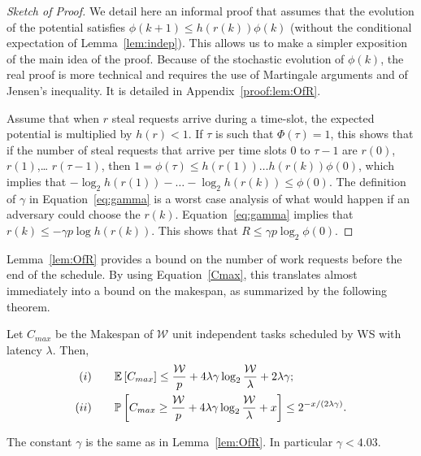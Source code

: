 \begin{proof}[Sketch of Proof]
  We detail here an informal proof that assumes that the evolution of
  the potential satisfies $\phi(k+1)\le h(r(k))\phi(k)$ (without the
  conditional expectation of Lemma~\ref{lem:indep}). This allows us to
  make a simpler exposition of the main idea of the proof.  Because of
  the stochastic evolution of $\phi(k)$, the real proof is more
  technical and requires the use of Martingale arguments and of
  Jensen's inequality. It is detailed in Appendix~\ref{proof:lem:OfR}.
  
  Assume that when $r$ steal requests arrive during a time-slot, the
  expected potential is multiplied by $h(r)<1$. If $\tau$ is such that
  $\Phi(\tau)=1$, this shows that if the number of steal requests that
  arrive per time slots $0$ to $\tau-1$ are $r(0)$, $r(1)$,\dots
  $r(\tau-1)$, then $1=\phi(\tau) \le h(r(1))\dots h(r(k)) \phi(0)$,
  which implies that
  $-\log_2 h(r(1))- \dots - \log_2 h(r(k))\le \phi(0)$.  The
  definition of $\gamma$ in Equation~\eqref{eq:gamma} is a worst case
  analysis of what would happen if an adversary could choose the
  $r(k)$. Equation~\eqref{eq:gamma} implies that
  $r(k)\le -\gamma p\log h(r(k))$. This shows that
  $R\le \gamma p \log_2\phi(0)$.
\end{proof}

Lemma~\ref{lem:OfR} provides a bound on the number of work requests
before the end of the schedule. By using Equation~\eqref{Cmax}, this
translates almost immediately into a bound on the makespan, as
summarized by the following theorem.
\begin{theorem}
  \label{theo:cmax}
  Let $C_{max}$ be the Makespan of $\mathcal{W}$ unit independent
  tasks scheduled by WS with latency $\lambda$.  Then,
  \begin{align*}
    (i)  \qquad &\esp{C_{max}} \leq \frac{\mathcal{W}}{p} +  4\lambda\gamma\log_2\frac{\mathcal{W}}{\lambda}  + 2\lambda\gamma;\\
    (ii) \qquad  &\Proba{ C_{max}  \ge \frac{\mathcal{W}}{p} +
                   4\lambda\gamma\log_2\frac{\mathcal{W}}{\lambda}  +
                   x} \le {2}^{-x/(2\lambda\gamma)}. 
  \end{align*}

  The constant $\gamma$ is the same as in Lemma~\ref{lem:OfR}. In
  particular $\gamma<4.03$.
\end{theorem}


